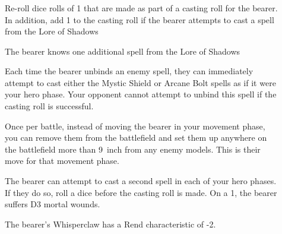 \subsubsection{}
\begin{description} 
    \item [] Re-roll dice rolls of 1 that
        are made as part of a casting roll for the bearer. In addition, add
        1 to the casting roll if the bearer attempts to cast a spell from the
        Lore of Shadows
    \item [] The bearer knows one
        additional spell from the Lore of Shadows 
    \item [] Each time the bearer
        unbinds an enemy spell, they can immediately attempt to cast either the
        Mystic Shield or Arcane Bolt spells as if it were your hero phase. Your
        opponent cannot attempt to unbind this spell if the casting roll is
        successful.
    \item [] Once per battle,
        instead of moving the bearer in your movement phase, you can remove
        them from the battlefield and set them up anywhere on the battlefield
        more than 9~inch from any enemy models. This is their move for that
        movement phase.
    \item [] The bearer can attempt to
        cast a second spell in each of your hero phases. If they do so, roll
        a dice before the casting roll is made. On a 1, the bearer suffers D3
        mortal wounds.
    \item [] The bearer’s Whisperclaw has
        a Rend characteristic of -2.
\end{description} 

